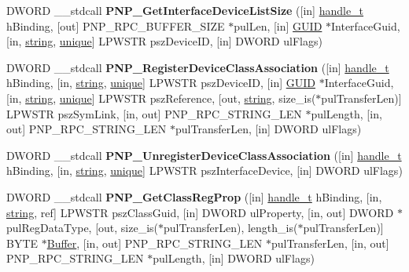\begin{DoxyCompactItemize}
\item 
\mbox{\label{interfacepnp_a51eedb5bc67da735b33034964a97f059}} 
D\+W\+O\+RD \+\_\+\+\_\+stdcall {\bfseries P\+N\+P\+\_\+\+Get\+Interface\+Device\+List\+Size} (\mbox{[}in\mbox{]} \hyperlink{interfacevoid}{handle\+\_\+t} h\+Binding, \mbox{[}out\mbox{]} P\+N\+P\+\_\+\+R\+P\+C\+\_\+\+B\+U\+F\+F\+E\+R\+\_\+\+S\+I\+ZE $\ast$pul\+Len, \mbox{[}in\mbox{]} \hyperlink{interface_g_u_i_d}{G\+U\+ID} $\ast$Interface\+Guid, \mbox{[}in, \hyperlink{structstring}{string}, \hyperlink{interfaceunique}{unique}\mbox{]} L\+P\+W\+S\+TR psz\+Device\+ID, \mbox{[}in\mbox{]} D\+W\+O\+RD ul\+Flags)
\item 
\mbox{\label{interfacepnp_a768255685435f3684c1c7b4b1b93b86c}} 
D\+W\+O\+RD \+\_\+\+\_\+stdcall {\bfseries P\+N\+P\+\_\+\+Register\+Device\+Class\+Association} (\mbox{[}in\mbox{]} \hyperlink{interfacevoid}{handle\+\_\+t} h\+Binding, \mbox{[}in, \hyperlink{structstring}{string}, \hyperlink{interfaceunique}{unique}\mbox{]} L\+P\+W\+S\+TR psz\+Device\+ID, \mbox{[}in\mbox{]} \hyperlink{interface_g_u_i_d}{G\+U\+ID} $\ast$Interface\+Guid, \mbox{[}in, \hyperlink{structstring}{string}, \hyperlink{interfaceunique}{unique}\mbox{]} L\+P\+W\+S\+TR psz\+Reference, \mbox{[}out, \hyperlink{structstring}{string}, size\+\_\+is($\ast$pul\+Transfer\+Len)\mbox{]} L\+P\+W\+S\+TR psz\+Sym\+Link, \mbox{[}in, out\mbox{]} P\+N\+P\+\_\+\+R\+P\+C\+\_\+\+S\+T\+R\+I\+N\+G\+\_\+\+L\+EN $\ast$pul\+Length, \mbox{[}in, out\mbox{]} P\+N\+P\+\_\+\+R\+P\+C\+\_\+\+S\+T\+R\+I\+N\+G\+\_\+\+L\+EN $\ast$pul\+Transfer\+Len, \mbox{[}in\mbox{]} D\+W\+O\+RD ul\+Flags)
\item 
\mbox{\label{interfacepnp_a3b9b53a19fc300ec2595c9abed30753d}} 
D\+W\+O\+RD \+\_\+\+\_\+stdcall {\bfseries P\+N\+P\+\_\+\+Unregister\+Device\+Class\+Association} (\mbox{[}in\mbox{]} \hyperlink{interfacevoid}{handle\+\_\+t} h\+Binding, \mbox{[}in, \hyperlink{structstring}{string}, \hyperlink{interfaceunique}{unique}\mbox{]} L\+P\+W\+S\+TR psz\+Interface\+Device, \mbox{[}in\mbox{]} D\+W\+O\+RD ul\+Flags)
\item 
\mbox{\label{interfacepnp_afea6e5818bd7318ef6ee03a2933eeeb5}} 
D\+W\+O\+RD \+\_\+\+\_\+stdcall {\bfseries P\+N\+P\+\_\+\+Get\+Class\+Reg\+Prop} (\mbox{[}in\mbox{]} \hyperlink{interfacevoid}{handle\+\_\+t} h\+Binding, \mbox{[}in, \hyperlink{structstring}{string}, ref\mbox{]} L\+P\+W\+S\+TR psz\+Class\+Guid, \mbox{[}in\mbox{]} D\+W\+O\+RD ul\+Property, \mbox{[}in, out\mbox{]} D\+W\+O\+RD $\ast$pul\+Reg\+Data\+Type, \mbox{[}out, size\+\_\+is($\ast$pul\+Transfer\+Len), length\+\_\+is($\ast$pul\+Transfer\+Len)\mbox{]} B\+Y\+TE $\ast$\hyperlink{class_buffer}{Buffer}, \mbox{[}in, out\mbox{]} P\+N\+P\+\_\+\+R\+P\+C\+\_\+\+S\+T\+R\+I\+N\+G\+\_\+\+L\+EN $\ast$pul\+Transfer\+Len, \mbox{[}in, out\mbox{]} P\+N\+P\+\_\+\+R\+P\+C\+\_\+\+S\+T\+R\+I\+N\+G\+\_\+\+L\+EN $\ast$pul\+Length, \mbox{[}in\mbox{]} D\+W\+O\+RD ul\+Flags)

\end{DoxyCompactItemize}
